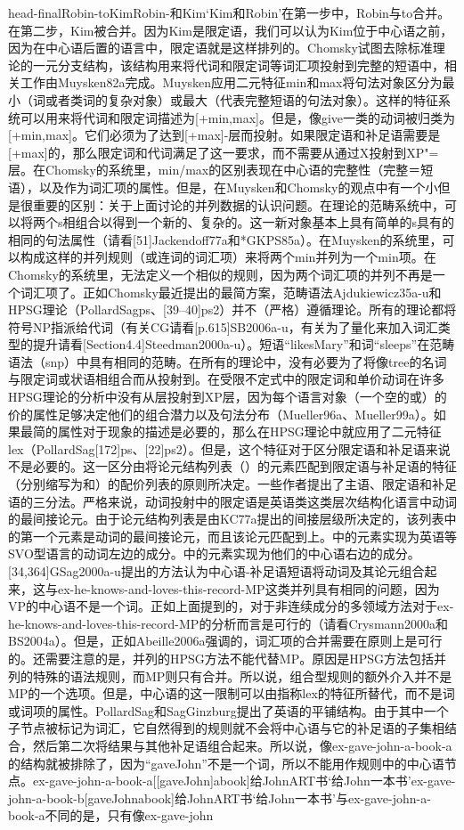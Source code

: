 head-finalRobin-toKimRobin-和Kim`Kim和Robin'在第一步中，Robin与to合并。在第二步，Kim被合并。因为Kim是限定语，我们可以认为Kim位于中心语之前，因为在中心语后置的语言中，限定语就是这样排列的。Chomsky试图去除标准理论的一元分支结构，该结构用来将代词和限定词等词汇项投射到完整的短语中，相关工作由Muysken82a完成。Muysken应用二元特征min和max将句法对象区分为最小（词或者类词的复杂对象）或最大（代表完整短语的句法对象）。这样的特征系统可以用来将代词和限定词描述为[+min,max]。但是，像give一类的动词被归类为[+min,max]。它们必须为了达到[+max]-层而投射。如果限定语和补足语需要是[+max]的，那么限定词和代词满足了这一要求，而不需要从通过X投射到XP"=层。在Chomsky的系统里，min/max的区别表现在中心语的完整性（完整＝短语），以及作为词汇项的属性。但是，在Muysken和Chomsky的观点中有一个小但是很重要的区别：关于上面讨论的并列数据的认识问题。在理论的范畴系统中，可以将两个s相组合以得到一个新的、复杂的。这一新对象基本上具有简单的s具有的相同的句法属性（请看[51]Jackendoff77a和*GKPS85a）。在Muysken的系统里，可以构成这样的并列规则（或连词的词汇项）来将两个min并列为一个min项。在Chomsky的系统里，无法定义一个相似的规则，因为两个词汇项的并列不再是一个词汇项了。正如Chomsky最近提出的最简方案，范畴语法Ajdukiewicz35a-u和HPSG理论（PollardSagps、[39--40]ps2）并不（严格）遵循理论。所有的理论都将符号NP指派给代词（有关CG请看[p.615]SB2006a-u，有关为了量化来加入词汇类型的提升请看[Section4.4]Steedman2000a-u）。短语“likesMary”和词“sleeps”在范畴语法（snp）中具有相同的范畴。在所有的理论中，没有必要为了将像tree的名词与限定词或状语相组合而从投射到。在受限不定式中的限定词和单价动词在许多HPSG理论的分析中没有从层投射到XP层，因为每个语言对象（一个空的或）的价的属性足够决定他们的组合潜力以及句法分布（Mueller96a、Mueller99a）。如果最简的属性对于现象的描述是必要的，那么在HPSG理论中就应用了二元特征lex（PollardSag[172]ps、[22]ps2）。但是，这个特征对于区分限定语和补足语来说不是必要的。这一区分由将论元结构列表（）的元素匹配到限定语与补足语的特征（分别缩写为和）的配价列表的原则所决定。一些作者提出了主语、限定语和补足语的三分法。严格来说，动词投射中的限定语是英语类这类层次结构化语言中动词的最间接论元。由于论元结构列表是由KC77a提出的间接层级所决定的，该列表中的第一个元素是动词的最间接论元，而且该论元匹配到上。中的元素实现为英语等SVO型语言的动词左边的成分。中的元素实现为他们的中心语右边的成分。[34,364]GSag2000a-u提出的方法认为中心语-补足语短语将动词及其论元组合起来，这与ex-he-knows-and-loves-this-record-MP这类并列具有相同的问题，因为VP的中心语不是一个词。正如上面提到的，对于非连续成分的多领域方法对于ex-he-knows-and-loves-this-record-MP的分析而言是可行的（请看Crysmann2000a和BS2004a）。但是，正如Abeille2006a强调的，词汇项的合并需要在原则上是可行的。还需要注意的是，并列的HPSG方法不能代替MP。原因是HPSG方法包括并列的特殊的语法规则，而MP则只有合并。所以说，组合型规则的额外介入并不是MP的一个选项。但是，中心语的这一限制可以由指称lex的特征所替代，而不是词或词项的属性。PollardSag和SagGinzburg提出了英语的平铺结构。由于其中一个子节点被标记为词汇，它自然得到的规则就不会将中心语与它的补足语的子集相结合，然后第二次将结果与其他补足语组合起来。所以说，像ex-gave-john-a-book-a的结构就被排除了，因为“gaveJohn”不是一个词，所以不能用作规则中的中心语节点。ex-gave-john-a-book-a[[gaveJohn]abook]给JohnART书`给John一本书'ex-gave-john-a-book-b[gaveJohnabook]给JohnART书`给John一本书'与ex-gave-john-a-book-a不同的是，只有像ex-gave-john